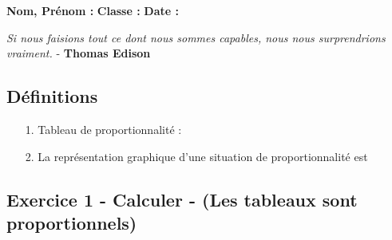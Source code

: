 



\textbf{Nom, Prénom :} \hspace{8cm} \textbf{Classe :} \hspace{3cm} \textbf{Date :}\\
\vspace{-0.8cm}
\begin{center}
  \textit{Si nous faisions tout ce dont nous sommes capables, nous nous surprendrions vraiment.}  - \textbf{Thomas Edison}
\end{center}
\vspace{-0.8cm}

\subsection*{Définitions}
  \begin{enumerate}
    \item[1.] Tableau de proportionnalité : \dotfill \\
    \Pointilles[2]
    \item[2.] La représentation graphique d'une situation de proportionnalité est \dotfill \\
    \Pointilles[1]
  \end{enumerate}

\subsection*{Exercice 1 - Calculer - (Les tableaux sont proportionnels)}

